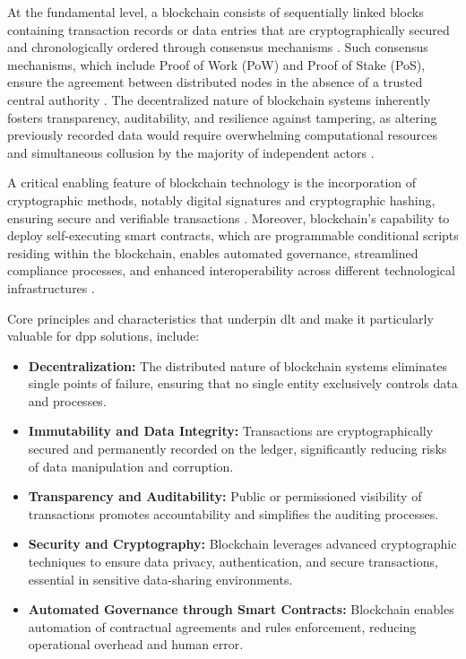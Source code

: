 At the fundamental level, a blockchain consists of sequentially linked blocks containing transaction records or data entries that are cryptographically secured and chronologically ordered through consensus mechanisms \autocite{WorldBankGroup.2017, Antonopoulos.2019}. Such consensus mechanisms, which include Proof of Work (PoW) and Proof of Stake (PoS), ensure the agreement between distributed nodes in the absence of a trusted central authority \autocite{Buterin.2014, WorldBankGroup.2017}. The decentralized nature of blockchain systems inherently fosters transparency, auditability, and resilience against tampering, as altering previously recorded data would require overwhelming computational resources and simultaneous collusion by the majority of independent actors \autocite{WorldBankGroup.2017, Cachin.2017}.

A critical enabling feature of blockchain technology is the incorporation of cryptographic methods, notably digital signatures and cryptographic hashing, ensuring secure and verifiable transactions \autocite{WorldBankGroup.2017, Antonopoulos.2019}. Moreover, blockchain’s capability to deploy self-executing smart contracts, which are programmable conditional scripts residing within the blockchain, enables automated governance, streamlined compliance processes, and enhanced interoperability across different technological infrastructures \autocite{Buterin.2014, Zheng.2017}.

Core principles and characteristics that underpin \ac{dlt} and make it particularly valuable for \ac{dpp} solutions, include:

\begin{itemize}[itemsep=0.5\baselineskip]
    \item \textbf{Decentralization:} The distributed nature of blockchain systems eliminates single points of failure, ensuring that no single entity exclusively controls data and processes. \autocite{WorldBankGroup.2017}
    
    \item \textbf{Immutability and Data Integrity:} Transactions are cryptographically secured and permanently recorded on the ledger, significantly reducing risks of data manipulation and corruption. \autocite{Narayanan.2016}
    
    \item \textbf{Transparency and Auditability:} Public or permissioned visibility of transactions promotes accountability and simplifies the auditing processes. \autocite{WorldBankGroup.2017}
    
    \item \textbf{Security and Cryptography:} Blockchain leverages advanced cryptographic techniques to ensure data privacy, authentication, and secure transactions, essential in sensitive data-sharing environments. \autocite{WorldBankGroup.2017, Antonopoulos.2019}

    \item \textbf{Automated Governance through Smart Contracts:} Blockchain enables automation of contractual agreements and rules enforcement, reducing operational overhead and human error. \autocite{Buterin.2014, Cachin.2017}
\end{itemize}

